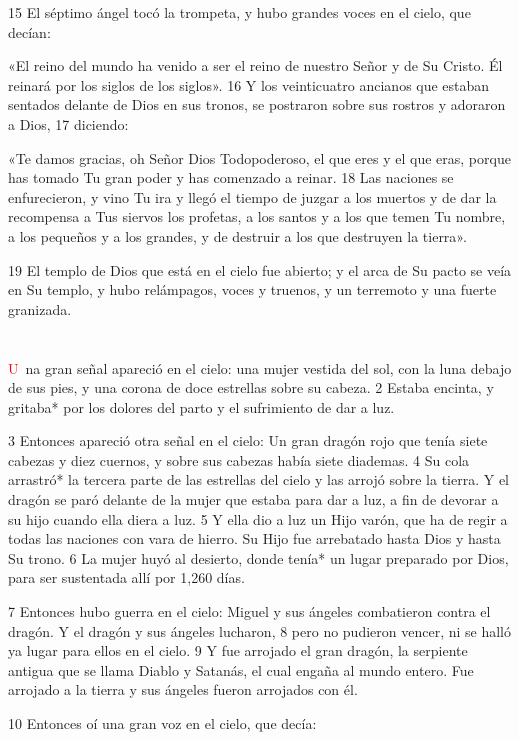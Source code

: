 \documentclass[12pt,twocolumn,twoside]{book}
\begin{document}
15 El séptimo ángel tocó la trompeta, y hubo grandes voces en el cielo, que decían:

«El reino del mundo ha venido a ser el reino de nuestro Señor y de Su Cristo. Él reinará por los siglos de los siglos». 16 Y los veinticuatro ancianos que estaban sentados delante de Dios en sus tronos, se postraron sobre sus rostros y adoraron a Dios, 17 diciendo:

«Te damos gracias, oh Señor Dios Todopoderoso, el que eres y el que eras, porque has tomado Tu gran poder y has comenzado a reinar. 18 Las naciones se enfurecieron, y vino Tu ira y llegó el tiempo de juzgar a los muertos y de dar la recompensa a Tus siervos los profetas, a los santos y a los que temen Tu nombre, a los pequeños y a los grandes, y de destruir a los que destruyen la tierra».

19 El templo de Dios que está en el cielo fue abierto; y el arca de Su pacto se veía en Su templo, y hubo relámpagos, voces y truenos, y un terremoto y una fuerte granizada.
\chapter{}
\lettrine[lines=4]{\textcolor{red}{U}}{\ }na gran señal apareció en el cielo: una mujer vestida del sol, con la luna debajo de sus pies, y una corona de doce estrellas sobre su cabeza. 2 Estaba encinta, y gritaba* por los dolores del parto y el sufrimiento de dar a luz.

3 Entonces apareció otra señal en el cielo: Un gran dragón rojo que tenía siete cabezas y diez cuernos, y sobre sus cabezas había siete diademas. 4 Su cola arrastró* la tercera parte de las estrellas del cielo y las arrojó sobre la tierra. Y el dragón se paró delante de la mujer que estaba para dar a luz, a fin de devorar a su hijo cuando ella diera a luz. 5 Y ella dio a luz un Hijo varón, que ha de regir a todas las naciones con vara de hierro. Su Hijo fue arrebatado hasta Dios y hasta Su trono. 6 La mujer huyó al desierto, donde tenía* un lugar preparado por Dios, para ser sustentada allí por 1,260 días.

7 Entonces hubo guerra en el cielo: Miguel y sus ángeles combatieron contra el dragón. Y el dragón y sus ángeles lucharon, 8 pero no pudieron vencer, ni se halló ya lugar para ellos en el cielo. 9 Y fue arrojado el gran dragón, la serpiente antigua que se llama Diablo y Satanás, el cual engaña al mundo entero. Fue arrojado a la tierra y sus ángeles fueron arrojados con él.

10 Entonces oí una gran voz en el cielo, que decía:
\end{document}
